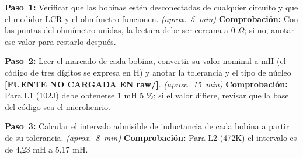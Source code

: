 \documentclass[12pt]{article}
\begin{document}
\begin{pasos}
  \item \textbf{Paso~1:} Verificar que las bobinas estén desconectadas de cualquier circuito y que el medidor LCR y el ohmímetro funcionen. \emph{(aprox.~\SI{5}{\minute})} \textbf{Comprobación:} Con las puntas del ohmímetro unidas, la lectura debe ser cercana a 0 \ensuremath{\Omega}; si no, anotar ese valor para restarlo después.
  \item \textbf{Paso~2:} Leer el marcado de cada bobina, convertir su valor nominal a mH (el código de tres dígitos se expresa en \textmu{}H) y anotar la tolerancia y el tipo de núcleo \textbf{[FUENTE NO CARGADA EN raw/]}. \emph{(aprox.~\SI{15}{\minute})} \textbf{Comprobación:} Para L1 (102J) debe obtenerse 1 mH \textpm{}5 \%; si el valor difiere, revisar que la base del código sea el microhenrio.
  \item \textbf{Paso~3:} Calcular el intervalo admisible de inductancia de cada bobina a partir de su tolerancia. \emph{(aprox.~\SI{8}{\minute})} \textbf{Comprobación:} Para L2 (472K) el intervalo es de 4,23 mH a 5,17 mH.
\end{pasos}
\end{document}
